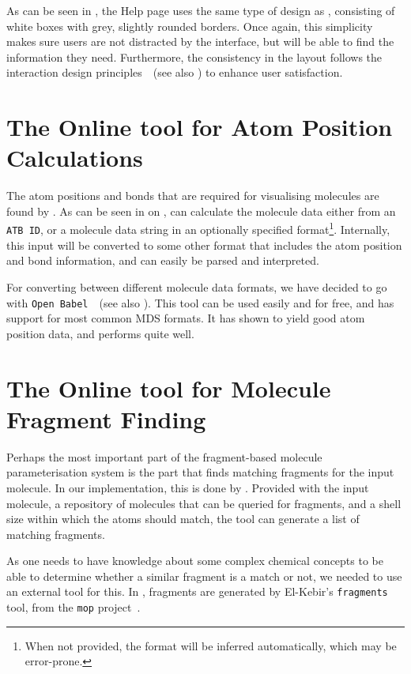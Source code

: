 As can be seen in , the Help page uses the same type of design as \oframp, consisting of white boxes with grey, slightly rounded borders. Once again, this simplicity makes sure users are not distracted by the interface, but will be able to find the information they need. Furthermore, the consistency in the layout follows the interaction design principles~\cite{norman2010gestural,blair2008user}~(see also ) to enhance user satisfaction.



\section[\oapoc]{The Online tool for Atom Position Calculations}
The atom positions and bonds that are required for visualising molecules are found by \oapoc. As can be seen in  on , \oapoc{} can calculate the molecule data either from an \verb|ATB ID|, or a molecule data string in an optionally specified format\footnote{When not provided, the format will be inferred automatically, which may be error-prone.}. Internally, this input will be converted to some other format that includes the atom position and bond information, and can easily be parsed and interpreted.

For converting between different molecule data formats, we have decided to go with \verb|Open Babel|~\cite{oboyle2011open}~(see also ). This tool can be used easily and for free, and has support for most common MDS formats. It has shown to yield good atom position data, and performs quite well.



\section[\omfraf]{The Online tool for Molecule Fragment Finding}
Perhaps the most important part of the fragment-based molecule parameterisation system is the part that finds matching fragments for the input molecule. In our implementation, this is done by \omfraf. Provided with the input molecule, a repository of molecules that can be queried for fragments, and a shell size within which the atoms should match, the tool can generate a list of matching fragments.

As one needs to have knowledge about some complex chemical concepts to be able to determine whether a similar fragment is a match or not, we needed to use an external tool for this. In \omfraf, fragments are generated by El-Kebir's \verb|fragments| tool, from the \verb|mop| project~\cite{elkebir2014molecule}.

